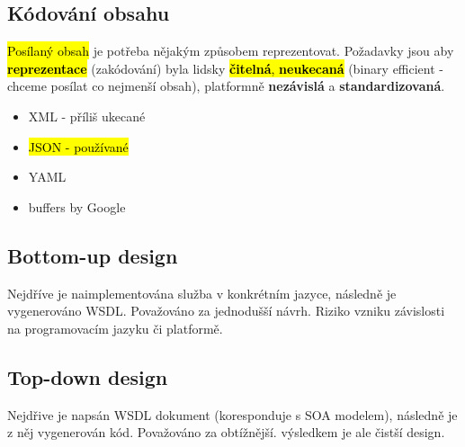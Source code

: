 \subsection{Kódování obsahu}
\hl{Posílaný obsah} je potřeba nějakým způsobem reprezentovat. Požadavky jsou aby \hl{\textbf{reprezentace}} (zakódování) byla lidsky \hl{\textbf{čitelná}, \textbf{neukecaná}} (binary efficient - chceme posílat co nejmenší obsah), platformně \textbf{nezávislá} a \textbf{standardizovaná}.

\begin{itemize}[itemsep=0px]
\item XML - příliš ukecané
\item \hl{JSON - používané}
\item YAML
\item buffers by Google
\end{itemize}

\subsection{Bottom-up design}
Nejdříve je naimplementována služba v konkrétním jazyce, následně je vygenerováno WSDL. Považováno za jednodušší návrh. Riziko vzniku závislosti na programovacím jazyku či platformě.

\subsection{Top-down design}
Nejdřive je napsán WSDL dokument (koresponduje s SOA modelem), následně je z něj vygenerován kód. Považováno za obtížnější. výsledkem je ale čistší design.
